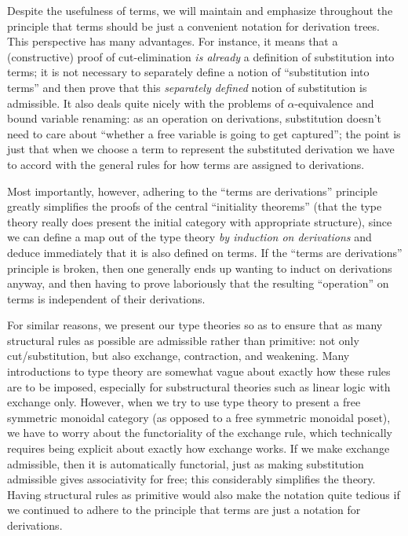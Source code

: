 \documentclass{book}
\begin{document}
Despite the usefulness of terms, we will maintain and emphasize throughout the principle that terms should be just a convenient notation for derivation trees.
This perspective has many advantages.
For instance, it means that a (constructive) proof of cut-elimination \emph{is already} a definition of substitution into terms; it is not necessary to separately define a notion of ``substitution into terms'' and then prove that this \emph{separately defined} notion of substitution is admissible.
It also deals quite nicely with the problems of $\alpha$-equivalence and bound variable renaming: as an operation on derivations, substitution doesn't need to care about ``whether a free variable is going to get captured''; the point is just that when we choose a term to represent the substituted derivation we have to accord with the general rules for how terms are assigned to derivations.

Most importantly, however, adhering to the ``terms are derivations'' principle greatly simplifies the proofs of the central ``initiality theorems'' (that the type theory really does present the initial category with appropriate structure), since we can define a map out of the type theory \emph{by induction on derivations} and deduce immediately that it is also defined on terms.
If the ``terms are derivations'' principle is broken, then one generally ends up wanting to induct on derivations anyway, and then having to prove laboriously that the resulting ``operation'' on terms is independent of their derivations.

For similar reasons, we present our type theories so as to ensure that as many structural rules as possible are admissible rather than primitive: not only cut/substitution, but also exchange, contraction, and weakening.
Many introductions to type theory are somewhat vague about exactly how these rules are to be imposed, especially for substructural theories such as linear logic with exchange only.
However, when we try to use type theory to present a free symmetric monoidal category (as opposed to a free symmetric monoidal poset), we have to worry about the functoriality of the exchange rule, which technically requires being explicit about exactly how exchange works.
If we make exchange admissible, then it is automatically functorial, just as making substitution admissible gives associativity for free; this considerably simplifies the theory.
Having structural rules as primitive would also make the notation quite tedious if we continued to adhere to the principle that terms are just a notation for derivations.
\end{document}
